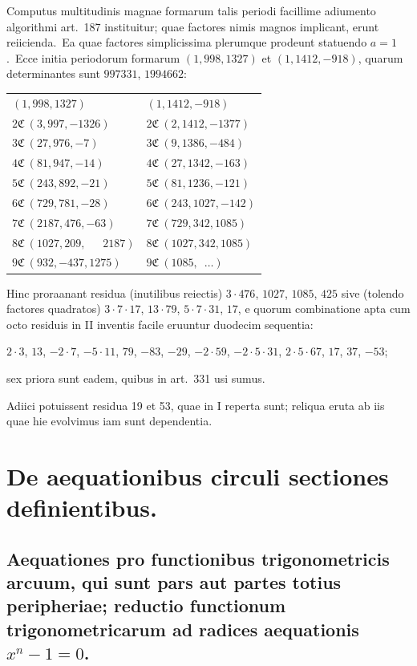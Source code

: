 \documentclass[12pt,a4paper]{article}
\theoremstyle{plain}
\theoremstyle{definition}
\theoremstyle{remark}
\begin{document}
Computus multitudinis magnae formarum talis periodi facillime adiumento
algorithmi art.\ 187 instituitur; quae factores nimis magnos implicant, erunt
reiicienda.\ Ea quae factores simplicissima plerumque prodeunt statuendo
$a=1$.\ Ecce initia periodorum formarum $(1,998,1327)$ et
$(1,1412,-918)$, quarum determinantes sunt $997331$, $1994662$:

\begin{center}
\begin{tabular}{ll}
$(1,998,1327)$ & $(1,1412,-918)$ \\
$2\mathfrak{C}\ (3,997,-1326)$ & $2\mathfrak{C}\ (2,1412,-1377)$ \\
$3\mathfrak{C}\ (27,976,-7)$ & $3\mathfrak{C}\ (9,1386,-484)$ \\
$4\mathfrak{C}\ (81,947,-14)$ & $4\mathfrak{C}\ (27,1342,-163)$ \\
$5\mathfrak{C}\ (243,892,-21)$ & $5\mathfrak{C}\ (81,1236,-121)$ \\
$6\mathfrak{C}\ (729,781,-28)$ & $6\mathfrak{C}\ (243,1027,-142)$ \\
$7\mathfrak{C}\ (2187,476,-63)$ & $7\mathfrak{C}\ (729,342,1085)$ \\
$8\mathfrak{C}\ (1027,209,\quad\,\,\,2187)$ & $8\mathfrak{C}\ (1027,342,1085)$ \\
$9\mathfrak{C}\ (932,-437,1275)$ & $9\mathfrak{C}\ (1085,\,\,\,\dots)$
\end{tabular}
\end{center}

Hinc proraanant residua (inutilibus reiectis) $3\cdot 476$, $1027$, $1085$,
$425$ sive (tolendo factores quadratos) $3\cdot 7\cdot 17$, $13\cdot 79$, $5\cdot 7\cdot 31$,
$17$, e quorum combinatione apta cum octo residuis in II inventis facile
eruuntur duodecim sequentia:

$2\cdot 3$, $13$, $-2\cdot 7$, $-5\cdot 11$, $79$, $-83$, $-29$, $-2\cdot 59$,
$-2\cdot 5\cdot 31$, $2\cdot 5\cdot 67$, $17$, $37$, $-53$;

sex priora sunt eadem, quibus in art.\ 331 usi sumus.

Adiici potuissent residua 19 et 53, quae in I reperta sunt; reliqua
eruta ab iis quae hie evolvimus iam sunt dependentia.

\section*{De aequationibus circuli sectiones definientibus.}

\subsection*{Aequationes pro functionibus trigonometricis arcuum, qui sunt
pars aut partes totius peripheriae; reductio functionum trigonometricarum
ad radices aequationis $x^n-1=0$.}
\end{document}
